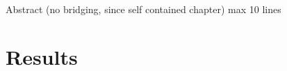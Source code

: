 Abstract (no bridging, since self contained chapter) max 10 lines


\section{Results}\label{sec:Conclusions:Results}


